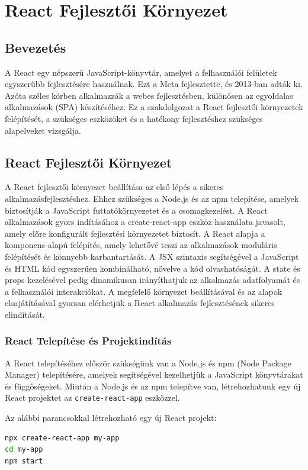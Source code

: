 \documentclass[colorlinks]{thesis-kando}
\theoremstyle{definition}
\theoremstyle{remark}
\begin{document}
\chapter{React Fejlesztői Környezet}

\section{Bevezetés}
A React egy népszerű JavaScript-könyvtár, amelyet a felhasználói felületek egyszerűbb fejlesztésére használnak. Ezt a Meta fejlesztette, és 2013-ban adták ki. Azóta széles körben alkalmazzák a webes fejlesztésben, különösen az egyoldalas alkalmazások (SPA) készítéséhez. Ez a szakdolgozat a React fejlesztői környezetek felépítését, a szükséges eszközöket és a hatékony fejlesztéshez szükséges alapelveket vizsgálja.

\section{React Fejlesztői Környezet}
A React fejlesztői környezet beállítása az első lépés a sikeres alkalmazásfejlesztéshez. Ehhez szükséges a Node.js és az npm telepítése, amelyek biztosítják a JavaScript futtatókörnyezetet és a csomagkezelést. A React alkalmazások gyors indításához a create-react-app eszköz használata javasolt, amely előre konfigurált fejlesztési környezetet biztosít. A React alapja a komponens-alapú felépítés, amely lehetővé teszi az alkalmazások moduláris felépítését és könnyebb karbantartását. A JSX szintaxis segítségével a JavaScript és HTML kód egyszerűen kombinálható, növelve a kód olvashatóságát. A state és props kezelésével pedig dinamikusan irányíthatjuk az alkalmazás adatfolyamát és a felhasználói interakciókat. A megfelelő környezet beállításával és az alapok elsajátításával gyorsan elérhetjük a React alkalmazás fejlesztésének sikeres elindítását.

\subsection{React Telepítése és Projektindítás}
A React telepítéséhez először szükségünk van a Node.js és npm (Node Package Manager) telepítésére, amelyek segítségével kezelhetjük a JavaScript könyvtárakat és függőségeket. Miután a Node.js és az npm telepítve van, létrehozhatunk egy új React projektet az \texttt{create-react-app} eszközzel.

Az alábbi parancsokkal létrehozható egy új React projekt:
\begin{lstlisting}[language=bash]
npx create-react-app my-app
cd my-app
npm start
\end{lstlisting}
\end{document}
